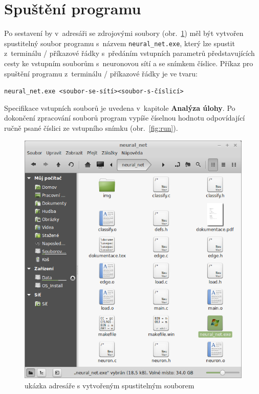 \documentclass[12pt, a4paper, titlepage]{report}
\begin{document}
\section{Spuštění programu}
Po sestavení by v~adresáři se zdrojovými soubory (obr.~\ref{fig:dir}) měl být vytvořen spustitelný soubor programu s~názvem \texttt{neural\_net.exe}, který lze spustit z~terminálu / příkazové řádky s~předáním vstupních parametrů představujících cesty ke vstupním souborům s~neuronovou sítí a se snímkem číslice. Příkaz pro spuštění programu z~terminálu / příkazové řádky je ve tvaru:
\par\noindent
\texttt{neural\_net.exe \textless soubor-se-sítí\textgreater \textless soubor-s-číslicí\textgreater}
\par\noindent
Specifikace vstupních souborů je uvedena v~kapitole \textbf{Analýza úlohy}. Po dokončení zpracování souborů program vypíše číselnou hodnotu odpovídající ručně psané číslici ze vstupního snímku (obr.~\ref{fig:run}).
\begin{figure}[htbp]
    \centering
    \includegraphics[width=12cm]{img/dir.png}
    \caption{ukázka adresáře s vytvořeným spustitelným souborem}
    \label{fig:dir}
\end{figure}
\end{document}
